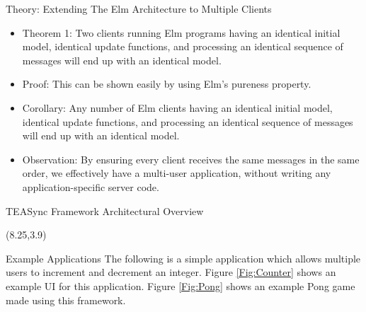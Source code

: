 \documentclass[22pt]{beamer}
\begin{document}
\begin{frame}[fragile]
\begin{textblock}{7.25}
        \begin{block}{\fontsize{37}{20}\selectfont Theory: Extending The Elm Architecture to Multiple Clients}
            \begin{itemize}
                \item Theorem 1: Two clients running Elm programs having an identical initial model,
                      identical update functions, and processing an identical sequence of messages will end up
                      with an identical model.
                \item Proof: This can be shown easily by using Elm's pureness property.
                \item Corollary: Any number of Elm clients having an identical initial model,
                      identical update functions, and processing an identical sequence of messages will end up
                      with an identical model.
                \item Observation: By ensuring every client receives the same messages in the same order,
                      we effectively have a multi-user application, without writing any application-specific server
                      code.
            \end{itemize}
        \end{block}

        \begin{block}{\fontsize{37}{20}\selectfont TEASync Framework Architectural Overview}
            \vspace{-6mm}
        \end{block}
    \end{textblock}

    \begin{textblock}{7.25}(8.25,3.9)
        \begin{block}{\fontsize{37}{20}\selectfont Example Applications}
            The following is a simple application which allows multiple users to increment and decrement an
            integer. Figure \ref{Fig:Counter} shows an example UI for this application. Figure \ref{Fig:Pong} shows an example Pong game made using this framework.


\end{block}
\end{textblock}
\end{frame}
\end{document}
